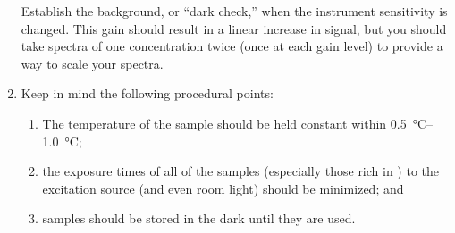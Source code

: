 \begin{enumerate}
	Establish the background, or ``dark check,'' when the instrument sensitivity is changed.
  This gain should result in a linear increase in signal, but you should take spectra of one concentration twice (once at each gain level) to provide a way to scale your spectra. 
	\item Keep in mind the following procedural points: 
	\begin{enumerate}
		\item The temperature of the sample should be held constant within \SIrange{0.5}{1.0}{\celsius}; 
		\item the exposure times of all of the samples (especially those rich in ) to the excitation source (and even room light) should be minimized; and 
		\item samples should be stored in the dark until they are used.
	\end{enumerate}
\end{enumerate}


